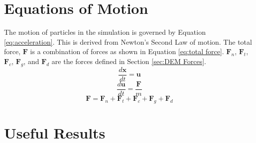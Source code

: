 \documentclass[a4paper,11pt,titlepage]{report}
\begin{document}
\section{Equations of Motion}
The motion of particles in the simulation is governed by Equation \ref{eq:acceleration}. This is derived from Newton's Second Law of motion. The total force, $\mathbf{F}$ is a combination of forces as shown in Equation \ref{eq:total force}. $\mathbf{F}_{n}$, $\mathbf{F}_{t}$, $\mathbf{F}_{c}$, $\mathbf{F}_{g}$, and $\mathbf{F}_{d}$ are the forces defined in Section \ref{sec:DEM Forces}.
\begin{equation}
\dfrac{d\mathbf{x}}{dt} = \mathbf{u}
\label{eq:position}
\end{equation}
\begin{equation}
\dfrac{d\mathbf{u}}{dt} = \dfrac{\mathbf{F}}{m}
\label{eq:acceleration}
\end{equation}
\begin{equation}
\mathbf{F} = \mathbf{F}_{n} + \mathbf{F}_{t} + \mathbf{F}_{c} + \mathbf{F}_{g} + \mathbf{F}_{d}
\label{eq:total force}
\end{equation}
\section{Useful Results}
\end{document}
